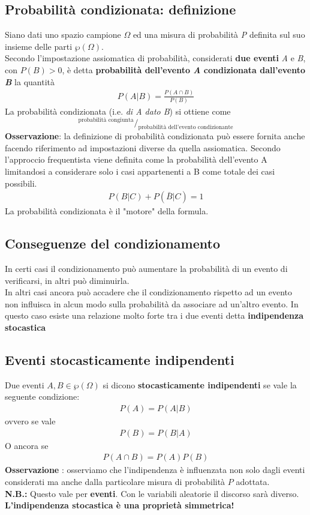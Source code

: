 \subsection{Probabilità condizionata: definizione}
Siano dati uno spazio campione $\Omega$ ed una misura di probabilità \textit{P} definita sul suo insieme delle parti $\wp (\Omega)$. \\
Secondo l'impostazione assiomatica di probabilità, considerati \textbf{due eventi} \textit{A} e \textit{B}, con $P(B) >0$, è detta \textbf{probabilità dell'evento \textit{A} condizionata dall'evento \textit{B}} la quantità 
\begin{align}
	P(A | B) = \frac{P(A \cap B)}{P(B)}
\end{align}
La probabilità condizionata (i.e. \textit{di A dato B}) si ottiene come 
\[
^\text{probabilità congiunta}/_\text{probabilità dell'evento condizionante}\]
\textbf{Osservazione}: la definizione di probabilità condizionata può essere fornita anche facendo riferimento ad impostazioni diverse da quella assiomatica. Secondo l’approccio frequentista viene definita come la probabilità dell’evento A limitandosi a considerare solo i casi appartenenti a B come totale dei casi possibili.
\begin{align}
	P(B|C) + P(\bar{B}|C) = 1
\end{align}
La probabilità condizionata è il "motore" della formula.

\subsection{Conseguenze del condizionamento}
In certi casi il condizionamento può aumentare la probabilità di un evento di verificarsi, in altri può diminuirla. \\
In altri casi ancora può accadere che il condizionamento rispetto ad un evento non influisca in alcun modo sulla probabilità da associare ad un’altro evento. In questo caso esiste una relazione molto forte tra i due eventi detta \textbf{indipendenza stocastica}

\subsection{Eventi stocasticamente indipendenti}
Due eventi $A, B \in \wp (\Omega)$ si dicono \textbf{stocasticamente indipendenti} se vale la seguente condizione:
\begin{align}
	P(A) = P(A | B)
\end{align}
ovvero se vale 
\begin{align}
P(B) = P(B | A)
\end{align}
O ancora se 
\begin{align}
	P(A \cap B) = P(A)P(B)
\end{align}
\textbf{Osservazione }: osserviamo che l’indipendenza è influenzata non solo dagli eventi considerati ma anche dalla particolare misura di probabilità $P$ adottata. \\
\textbf{N.B.:} Questo vale per \textbf{eventi}. Con le variabili aleatorie il discorso sarà diverso. \\
\textbf{L'indipendenza stocastica è una proprietà simmetrica!}

